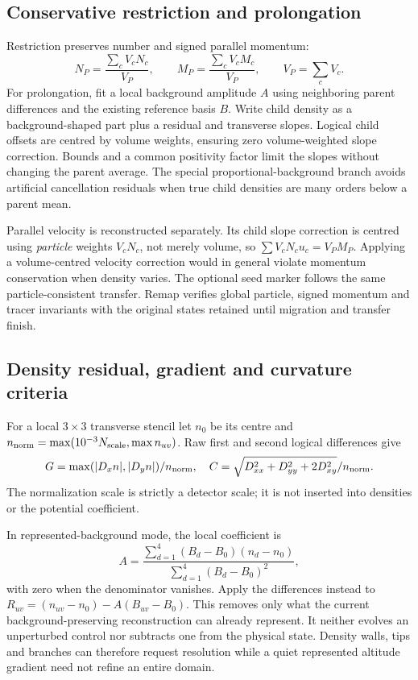\subsection{Conservative restriction and prolongation}
Restriction preserves number and signed parallel momentum:
\begin{equation}
 N_P=\frac{\sum_cV_cN_c}{V_P},\qquad
 M_P=\frac{\sum_cV_cM_c}{V_P},\qquad V_P=\sum_cV_c.
\end{equation}
For prolongation, fit a local background amplitude $A$ using neighboring
parent differences and the existing reference basis $B$. Write child
density as a background-shaped part plus a residual and transverse slopes.
Logical child offsets are centred by volume weights, ensuring zero
volume-weighted slope correction. Bounds and a common positivity factor
limit the slopes without changing the parent average. The special
proportional-background branch avoids artificial cancellation residuals
when true child densities are many orders below a parent mean.

Parallel velocity is reconstructed separately. Its child slope correction
is centred using \emph{particle} weights $V_cN_c$, not merely volume,
so $\sum V_cN_cu_c=V_PM_P$. Applying a volume-centred velocity correction
would in general violate momentum conservation when density varies.
The optional seed marker follows the same particle-consistent transfer.
Remap verifies global particle, signed momentum and tracer invariants with
the original states retained until migration and transfer finish.

\subsection{Density residual, gradient and curvature criteria}
For a local $3\times3$ transverse stencil let
$n_0$ be its centre and
$n_{\rm norm}=\max(10^{-3}N_{\rm scale},\max n_{uv})$.
Raw first and second logical differences give
\begin{equation}
 G=\max(|D_xn|,|D_yn|)/n_{\rm norm},\quad
 C=\sqrt{D_{xx}^2+D_{yy}^2+2D_{xy}^2}/n_{\rm norm}.
\end{equation}
The normalization scale is strictly a detector scale; it is not inserted
into densities or the potential coefficient.

In represented-background mode, the local coefficient is
\begin{equation}
 A=\frac{\sum_{d=1}^4(B_d-B_0)(n_d-n_0)}
          {\sum_{d=1}^4(B_d-B_0)^2},
\end{equation}
with zero when the denominator vanishes. Apply the differences instead to
$R_{uv}=(n_{uv}-n_0)-A(B_{uv}-B_0)$. This removes only what the current
background-preserving reconstruction can already represent. It neither
evolves an unperturbed control nor subtracts one from the physical state.
Density walls, tips and branches can therefore request resolution while
a quiet represented altitude gradient need not refine an entire domain.

